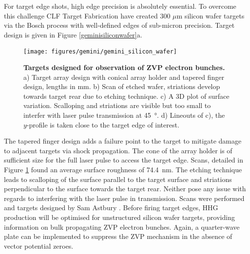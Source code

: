 For target edge shots, high edge precision is absolutely essential. To overcome this challenge CLF Target Fabrication have created 300 $\mu$m silicon wafer targets via the Bosch process with well-defined edges of sub-micron precision. Target design is given in Figure \ref{geminisiliconwafer}a.
\begin{figure}
	\centering
	\texttt{[image: figures/gemini/gemini\_silicon\_wafer]}
	\caption[Attosecond ZVP electron bunch targets]{\textbf{Targets designed for observation of ZVP electron bunches.} a) Target array design with conical array holder and tapered finger design, lengths in mm. b) Scan of etched wafer, striations develop towards target rear due to etching technique. c) A 3D plot of surface variation. Scalloping and striations are visible but too small to interfer with laser pulse transmission at \qty{45}{\degree}. d) Lineouts of c), the $y$-profile is taken close to the target edge of interest.}
	\label{fig:geminisiliconwafer}
\end{figure}
The tapered finger design adds a failure point to the target to mitigate damage to adjacent targets via shock propagation. The cone of the array holder is of sufficient size for the full laser pulse to access the target edge. Scans, detailed in Figure \ref{fig:geminisiliconwafer} found an average surface roughness of \qty{74.4}{nm}. The etching technique leads to scalloping of the surface parallel to the target surface and striations perpendicular to the surface towards the target rear. Neither pose any issue with regards to interfering with the laser pulse in transmission. Scans were performed and targets designed by Sam Astbury \cite{astburyTargetFabricationGroup2024}. Before firing target edges, HHG production will be optimised for unstructured silicon wafer targets, providing information on bulk propagating ZVP electron bunches. Again, a quarter-wave plate can be implemented to suppress the ZVP mechanism in the absence of vector potential zeroes.

